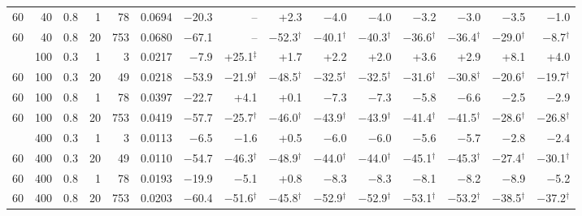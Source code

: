 \begin{tabular}{@{}rrrrr rrrrrrrrrr@{}}
60 & 40 & 0.8 & 1 & 78 & 0.0694 & $-$20.3 & -- & +2.3 & $-$4.0 & $-$4.0 & $-$3.2 & $-$3.0 & $-$3.5 & $-$1.0 \\
60 & 40 & 0.8 & 20 & 753 & 0.0680 & $-$67.1 & -- & $-$52.3$^{\dagger}$ & $-$40.1$^{\dagger}$ & $-$40.3$^{\dagger}$ & $-$36.6$^{\dagger}$ & $-$36.4$^{\dagger}$ & $-$29.0$^{\dagger}$ & $-$8.7$^{\dagger}$ \\
\addlinespace[1pt]
60 & 100 & 0.3 & 1 & 3 & 0.0217 & $-$7.9 & +25.1$^{\ddagger}$ & +1.7 & +2.2 & +2.0 & +3.6 & +2.9 & +8.1 & +4.0 \\
60 & 100 & 0.3 & 20 & 49 & 0.0218 & $-$53.9 & $-$21.9$^{\dagger}$ & $-$48.5$^{\dagger}$ & $-$32.5$^{\dagger}$ & $-$32.5$^{\dagger}$ & $-$31.6$^{\dagger}$ & $-$30.8$^{\dagger}$ & $-$20.6$^{\dagger}$ & $-$19.7$^{\dagger}$ \\
60 & 100 & 0.8 & 1 & 78 & 0.0397 & $-$22.7 & +4.1 & +0.1 & $-$7.3 & $-$7.3 & $-$5.8 & $-$6.6 & $-$2.5 & $-$2.9 \\
60 & 100 & 0.8 & 20 & 753 & 0.0419 & $-$57.7 & $-$25.7$^{\dagger}$ & $-$46.0$^{\dagger}$ & $-$43.9$^{\dagger}$ & $-$43.9$^{\dagger}$ & $-$41.4$^{\dagger}$ & $-$41.5$^{\dagger}$ & $-$28.6$^{\dagger}$ & $-$26.8$^{\dagger}$ \\
\addlinespace[1pt]
60 & 400 & 0.3 & 1 & 3 & 0.0113 & $-$6.5 & $-$1.6 & +0.5 & $-$6.0 & $-$6.0 & $-$5.6 & $-$5.7 & $-$2.8 & $-$2.4 \\
60 & 400 & 0.3 & 20 & 49 & 0.0110 & $-$54.7 & $-$46.3$^{\dagger}$ & $-$48.9$^{\dagger}$ & $-$44.0$^{\dagger}$ & $-$44.0$^{\dagger}$ & $-$45.1$^{\dagger}$ & $-$45.3$^{\dagger}$ & $-$27.4$^{\dagger}$ & $-$30.1$^{\dagger}$ \\
60 & 400 & 0.8 & 1 & 78 & 0.0193 & $-$19.9 & $-$5.1 & +0.8 & $-$8.3 & $-$8.3 & $-$8.1 & $-$8.2 & $-$8.9 & $-$5.2 \\
60 & 400 & 0.8 & 20 & 753 & 0.0203 & $-$60.4 & $-$51.6$^{\dagger}$ & $-$45.8$^{\dagger}$ & $-$52.9$^{\dagger}$ & $-$52.9$^{\dagger}$ & $-$53.1$^{\dagger}$ & $-$53.2$^{\dagger}$ & $-$38.5$^{\dagger}$ & $-$37.2$^{\dagger}$ \\
\bottomrule
\end{tabular}